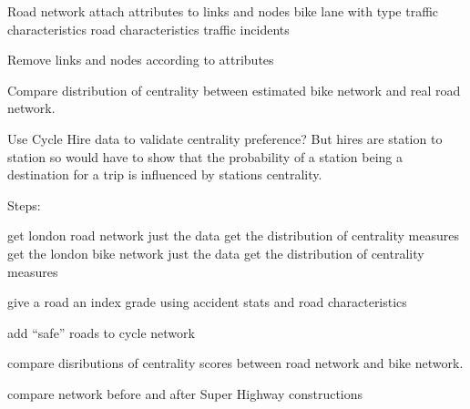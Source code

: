 \documentclass[11pt]{article} %
\begin{document}
Road network
	attach attributes to links and nodes
		bike lane with type
		traffic characteristics
		road characteristics
		traffic incidents
		
Remove links and nodes according to attributes

Compare distribution of centrality between estimated bike network and real road network. 

Use Cycle Hire data to validate centrality preference?
	But hires are station to station so would have to show that the probability of a station being a destination for a trip is influenced by stations centrality. 

Steps:

	get london road network
		just the data
		get the distribution of centrality measures
	get the london bike network
		just the data
		get the distribution of centrality measures
		
	give a road an index grade
		using accident stats and road characteristics
		
	add ``safe'' roads to cycle network
	
	compare disributions of centrality scores between road network and bike network. 
	
	compare network before and after Super Highway constructions


\section{}

\section{}

 
\end{document}
